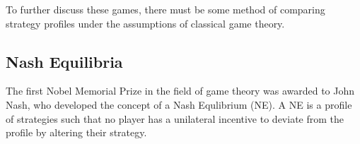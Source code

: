 









To further discuss these games, there must be some method of comparing strategy profiles under the assumptions of classical game theory. \\

\subsection{Nash Equilibria}
The first Nobel Memorial Prize in the field of game theory was awarded to John Nash, who developed the concept of a Nash Equlibrium (NE). A NE is a profile of strategies such that no player has a unilateral incentive to deviate from the profile by altering their strategy. \\


